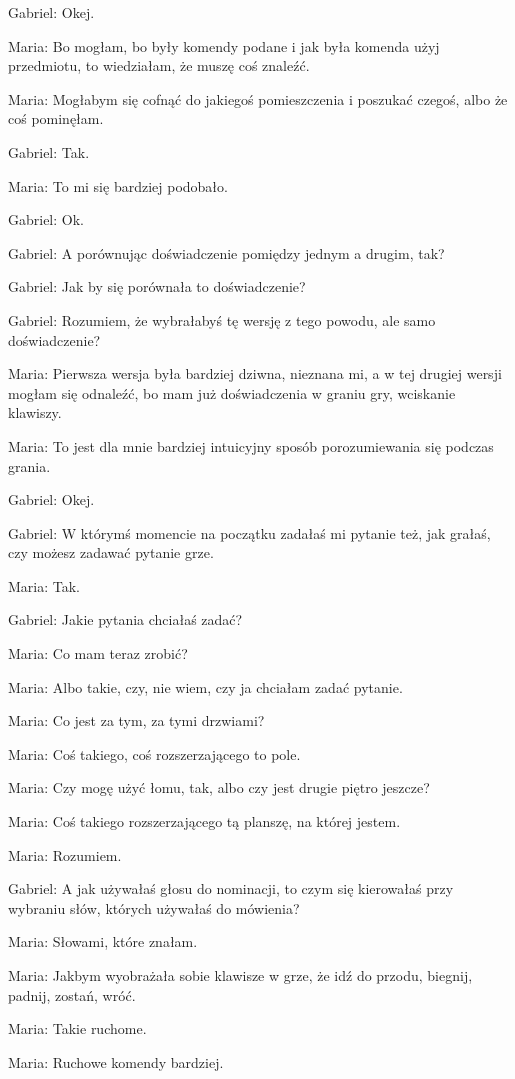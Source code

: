 Gabriel: Okej.

Maria: Bo mogłam, bo były komendy podane i jak była komenda użyj przedmiotu, to wiedziałam, że muszę coś znaleźć.

Maria: Mogłabym się cofnąć do jakiegoś pomieszczenia i poszukać czegoś, albo że coś pominęłam.

Gabriel: Tak.

Maria: To mi się bardziej podobało.

Gabriel: Ok.

Gabriel: A porównując doświadczenie pomiędzy jednym a drugim, tak?

Gabriel: Jak by się porównała to doświadczenie?

Gabriel: Rozumiem, że wybrałabyś tę wersję z tego powodu, ale samo doświadczenie?

Maria: Pierwsza wersja była bardziej dziwna, nieznana mi, a w tej drugiej wersji mogłam się odnaleźć, bo mam już doświadczenia w graniu gry, wciskanie klawiszy.

Maria: To jest dla mnie bardziej intuicyjny sposób porozumiewania się podczas grania.

Gabriel: Okej.

Gabriel: W którymś momencie na początku zadałaś mi pytanie też, jak grałaś, czy możesz zadawać pytanie grze.

Maria: Tak.

Gabriel: Jakie pytania chciałaś zadać?

Maria: Co mam teraz zrobić?

Maria: Albo takie, czy, nie wiem, czy ja chciałam zadać pytanie.

Maria: Co jest za tym, za tymi drzwiami?

Maria: Coś takiego, coś rozszerzającego to pole.

Maria: Czy mogę użyć łomu, tak, albo czy jest drugie piętro jeszcze?

Maria: Coś takiego rozszerzającego tą planszę, na której jestem.

Maria: Rozumiem.

Gabriel: A jak używałaś głosu do nominacji, to czym się kierowałaś przy wybraniu słów, których używałaś do mówienia?

Maria: Słowami, które znałam.

Maria: Jakbym wyobrażała sobie klawisze w grze, że idź do przodu, biegnij, padnij, zostań, wróć.

Maria: Takie ruchome.

Maria: Ruchowe komendy bardziej.

